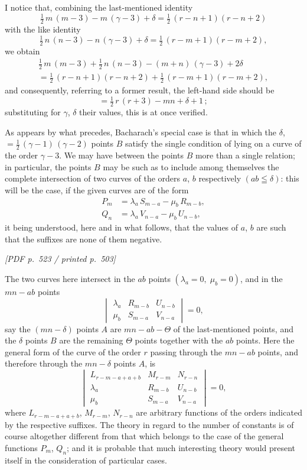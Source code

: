 \documentclass[11pt]{article}
\begin{document}
I notice that, combining the last-mentioned identity
\[
\tfrac{1}{2}\,m\,(m - 3) - m\,(\gamma - 3) + \delta = \tfrac{1}{2}\,(r - n + 1)(r - n + 2)
\]
with the like identity
\[
\tfrac{1}{2}\,n\,(n - 3) - n\,(\gamma - 3) + \delta = \tfrac{1}{2}\,(r - m + 1)(r - m + 2),
\]
we obtain
\begin{align*}
\tfrac{1}{2}\,m\,(m - 3) + \tfrac{1}{2}\,n\,(n - 3) - (m + n)\,(\gamma - 3) + 2\delta \\
= \tfrac{1}{2}\,(r - n + 1)(r - n + 2) + \tfrac{1}{2}\,(r - m + 1)(r - m + 2),
\end{align*}
and consequently, referring to a former result, the left-hand side should be
\[
= \tfrac{1}{2}\,r\,(r + 3) - mn + \delta + 1\,;
\]
substituting for $\gamma$, $\delta$ their values, this is at once verified.

As appears by what precedes, Bacharach's special case is that in which the $\delta$, $= \tfrac{1}{2}\,(\gamma - 1)\,(\gamma - 2)$ points $B$ satisfy the single condition of lying on a curve of the order $\gamma - 3$. We may have between the points $B$ more than a single relation; in particular, the points $B$ may be such as to include among themselves the complete intersection of two curves of the orders $a$, $b$ respectively $(ab \leqq \delta)$: this will be the case, if the given curves are of the form
\begin{align*}
P_{m} &= \lambda_{a}\,S_{m-a} - \mu_{b}\,R_{m-b}, \\
Q_{n} &= \lambda_{a}\,V_{n-a} - \mu_{b}\,U_{n-b},
\end{align*}
it being understood, here and in what follows, that the values of $a$, $b$ are such that the suffixes are none of them negative.

\vfill
\noindent\textit{[PDF p.~523 / printed p.~503]}
\newpage

\noindent The two curves here intersect in the $ab$ points $(\lambda_{a} = 0,\;\mu_{b} = 0)$, and in the $mn - ab$ points
\[
\begin{vmatrix} \lambda_{a} & R_{m-b} & U_{n-b} \\ \mu_{b} & S_{m-a} & V_{n-a} \end{vmatrix} = 0,
\]
say the $(mn - \delta)$ points $A$ are $mn - ab - \Theta$ of the last-mentioned points, and the $\delta$ points $B$ are the remaining $\Theta$ points together with the $ab$ points. Here the general form of the curve of the order $r$ passing through the $mn - ab$ points, and therefore through the $mn - \delta$ points $A$, is
\[
\begin{vmatrix} L_{r-m-a+a+b} & M_{r-m} & N_{r-n} \\ \lambda_{a} & R_{m-b} & U_{n-b} \\ \mu_{b} & S_{m-a} & V_{n-a} \end{vmatrix} = 0,
\]
where $L_{r-m-a+a+b}$, $M_{r-m}$, $N_{r-n}$ are arbitrary functions of the orders indicated by the respective suffixes. The theory in regard to the number of constants is of course altogether different from that which belongs to the case of the general functions $P_{m}$, $Q_{n}$; and it is probable that much interesting theory would present itself in the consideration of particular cases.
\end{document}
